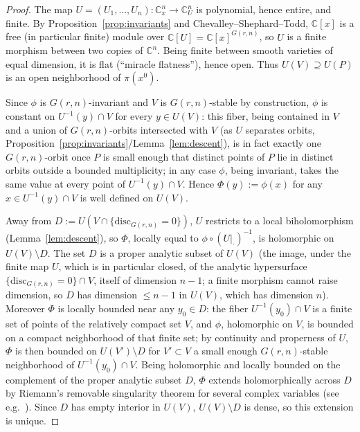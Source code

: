 \documentclass[10pt,a4paper]{amsart}
\newcommand{\CC}{\mathbb{C}}
\begin{document}
\begin{proof}
The map $U=(U_1,\dots,U_n):\CC^n_x\to\CC^n_U$ is polynomial, hence entire, and finite. By Proposition~\ref{prop:invariants} and Chevalley--Shephard--Todd, $\CC[x]$ is a free (in particular finite) module over $\CC[U]=\CC[x]^{G(r,n)}$, so $U$ is a finite morphism between two copies of $\CC^n$. Being finite between smooth varieties of equal dimension, it is flat (``miracle flatness''), hence open. Thus $U(V)\supseteq U(P)$ is an open neighborhood of $\pi(x^0)$.

Since $\phi$ is $G(r,n)$-invariant and $V$ is $G(r,n)$-stable by construction, $\phi$ is constant on $U^{-1}(y)\cap V$ for every $y\in U(V)$: this fiber, being contained in $V$ and a union of $G(r,n)$-orbits intersected with $V$ (as $U$ separates orbits, Proposition~\ref{prop:invariants}/Lemma~\ref{lem:descent}), is in fact exactly one $G(r,n)$-orbit once $P$ is small enough that distinct points of $P$ lie in distinct orbits outside a bounded multiplicity; in any case $\phi$, being invariant, takes the same value at every point of $U^{-1}(y)\cap V$. Hence $\Phi(y):=\phi(x)$ for any $x\in U^{-1}(y)\cap V$ is well defined on $U(V)$.

Away from $D:=U(V\cap\{\mathrm{disc}_{G(r,n)}=0\})$, $U$ restricts to a local biholomorphism (Lemma~\ref{lem:descent}), so $\Phi$, locally equal to $\phi\circ(U|_\cdot)^{-1}$, is holomorphic on $U(V)\setminus D$. The set $D$ is a proper analytic subset of $U(V)$ (the image, under the finite map $U$, which is in particular closed, of the analytic hypersurface $\{\mathrm{disc}_{G(r,n)}=0\}\cap V$, itself of dimension $n-1$; a finite morphism cannot raise dimension, so $D$ has dimension $\le n-1$ in $U(V)$, which has dimension $n$). Moreover $\Phi$ is locally bounded near any $y_0\in D$: the fiber $U^{-1}(y_0)\cap V$ is a finite set of points of the relatively compact set $V$, and $\phi$, holomorphic on $V$, is bounded on a compact neighborhood of that finite set; by continuity and properness of $U$, $\Phi$ is then bounded on $U(V')\setminus D$ for $V'\subset V$ a small enough $G(r,n)$-stable neighborhood of $U^{-1}(y_0)\cap V$. Being holomorphic and locally bounded on the complement of the proper analytic subset $D$, $\Phi$ extends holomorphically across $D$ by Riemann's removable singularity theorem for several complex variables (see e.g.\ \cite{GH}). Since $D$ has empty interior in $U(V)$, $U(V)\setminus D$ is dense, so this extension is unique.
\end{proof}
\end{document}
